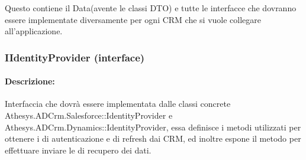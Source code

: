Questo  contiene il  Data(avente le classi DTO) e tutte le interfacce che dovranno essere implementate diversamente per ogni CRM che si vuole collegare all'applicazione. 
\newpage
\subsubsection{IIdentityProvider (interface)}

\paragraph{Descrizione:}
Interfaccia che dovrà essere implementata dalle classi concrete Athesys.ADCrm.Salesforce::IdentityProvider e\\ Athesys.ADCrm.Dynamics::IdentityProvider, essa definisce i metodi utilizzati per ottenere i  di autenticazione e di refresh dai CRM, ed inoltre espone il metodo per effettuare inviare le  di recupero dei dati.

